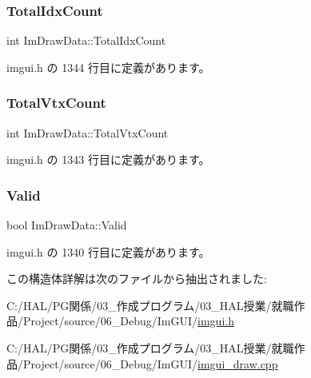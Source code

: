 \subsubsection{\texorpdfstring{Total\+Idx\+Count}{TotalIdxCount}}
{\footnotesize\ttfamily int Im\+Draw\+Data\+::\+Total\+Idx\+Count}



 imgui.\+h の 1344 行目に定義があります。

\mbox{\label{struct_im_draw_data_af0035b52cdf91932b25eaf2da853965a}} 
\subsubsection{\texorpdfstring{Total\+Vtx\+Count}{TotalVtxCount}}
{\footnotesize\ttfamily int Im\+Draw\+Data\+::\+Total\+Vtx\+Count}



 imgui.\+h の 1343 行目に定義があります。

\mbox{\label{struct_im_draw_data_ad01ab9ce5e8843b7860ccbb3eb9a6554}} 
\subsubsection{\texorpdfstring{Valid}{Valid}}
{\footnotesize\ttfamily bool Im\+Draw\+Data\+::\+Valid}



 imgui.\+h の 1340 行目に定義があります。



この構造体詳解は次のファイルから抽出されました\+:\begin{DoxyCompactItemize}
\item 
C\+:/\+H\+A\+L/\+P\+G関係/03\+\_\+作成プログラム/03\+\_\+\+H\+A\+L授業/就職作品/\+Project/source/06\+\_\+\+Debug/\+Im\+G\+U\+I/\mbox{\hyperlink{imgui_8h}{imgui.\+h}}\item 
C\+:/\+H\+A\+L/\+P\+G関係/03\+\_\+作成プログラム/03\+\_\+\+H\+A\+L授業/就職作品/\+Project/source/06\+\_\+\+Debug/\+Im\+G\+U\+I/\mbox{\hyperlink{imgui__draw_8cpp}{imgui\+\_\+draw.\+cpp}}\end{DoxyCompactItemize}
